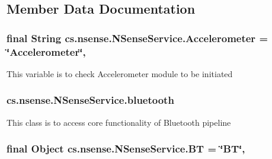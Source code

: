 \subsection{Member Data Documentation}
\hypertarget{classcs_1_1nsense_1_1_n_sense_service_a40c08641605393a1f47231fa8301563f}{
\subsubsection[{Accelerometer}]{\setlength{\rightskip}{0pt plus 5cm}final String cs.\-nsense.\-N\-Sense\-Service.\-Accelerometer = \char`\"{}Accelerometer\char`\"{}\hspace{0.3cm}{\ttfamily [static]}, {\ttfamily [private]}}}\label{classcs_1_1nsense_1_1_n_sense_service_a40c08641605393a1f47231fa8301563f}
This variable is to check Accelerometer module to be initiated \hypertarget{classcs_1_1nsense_1_1_n_sense_service_aacd6c54af2899f5ea8e97c4082eadea6}{
\subsubsection[{bluetooth}]{ cs.\-nsense.\-N\-Sense\-Service.\-bluetooth\hspace{0.3cm}{\ttfamily [private]}}}\label{classcs_1_1nsense_1_1_n_sense_service_aacd6c54af2899f5ea8e97c4082eadea6}
This class is to access core functionality of Bluetooth pipeline \hypertarget{classcs_1_1nsense_1_1_n_sense_service_ab36780ff8d628f6cb3fdc8f77fe36a1f}{
\subsubsection[{B\-T}]{\setlength{\rightskip}{0pt plus 5cm}final Object cs.\-nsense.\-N\-Sense\-Service.\-B\-T = \char`\"{}B\-T\char`\"{}\hspace{0.3cm}{\ttfamily [static]}, {\ttfamily [private]}}}\label{classcs_1_1nsense_1_1_n_sense_service_ab36780ff8d628f6cb3fdc8f77fe36a1f}
